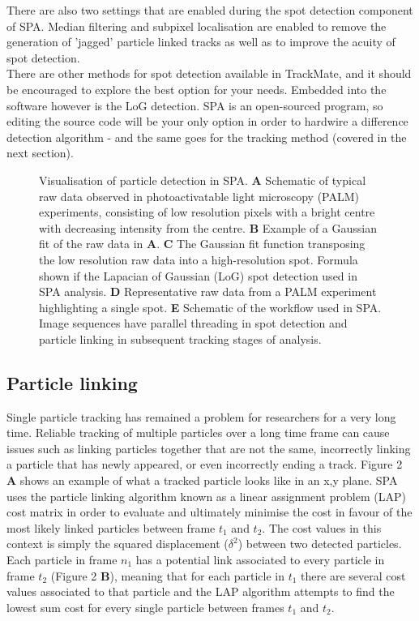 \documentclass[11pt]{article} %
\begin{document}
There are also two settings that are enabled during the spot detection component of SPA. Median filtering and subpixel localisation are enabled to remove the generation of 'jagged' particle linked tracks as well as to improve the acuity of spot detection.\\

There are other methods for spot detection available in TrackMate, and it should be encouraged to explore the best option for your needs. Embedded into the software however is the LoG detection. SPA is an open-sourced program, so editing the source code will be your only option in order to hardwire a difference detection algorithm - and the same goes for the tracking method (covered in the next section).

	\begin{figure}
	\caption{Visualisation of particle detection in SPA. \textbf{A} Schematic of typical raw data observed in photoactivatable light microscopy (PALM) 					experiments, consisting of low resolution pixels with a bright centre with decreasing intensity from the centre. \textbf{B} Example of a Gaussian fit of the raw 		data in \textbf{A}. \textbf{C} The Gaussian fit function transposing the low resolution raw data into a high-resolution spot. Formula shown if the Lapacian of 		Gaussian (LoG) spot detection used in SPA analysis. \textbf{D} Representative raw data from a PALM experiment highlighting a single spot. \textbf{E} 				Schematic of the workflow used in SPA. Image sequences have parallel threading in spot detection and particle linking in subsequent tracking stages of 			analysis.}
	\end{figure}

\subsection{Particle linking}

Single particle tracking has remained a problem for researchers for a very long time. Reliable tracking of multiple particles over a long time frame can cause issues such as linking particles together that are not the same, incorrectly linking a particle that has newly appeared, or even incorrectly ending a track. Figure 2 \textbf{A} shows an example of what a tracked particle looks like in an x,y plane. SPA uses the particle linking algorithm known as a linear assignment problem (LAP) cost matrix in order to evaluate and ultimately minimise the cost in favour of the most likely linked particles between frame  $t_1$ and $t_2$. The cost values in this context is simply the squared displacement ($\delta^2$) between two detected particles. Each particle in frame $n_1$ has a potential link associated to every particle in frame $t_2$ (Figure 2 \textbf{B}), meaning that for each particle in $t_1$ there are several cost values associated to that particle and the LAP algorithm attempts to find the lowest sum cost for every single particle between frames $t_1$ and $t_2$. \\
\end{document}
